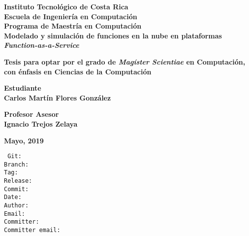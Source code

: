\documentclass[12pt, twoside]{report}
\begin{document}
\thispagestyle{plain}
\begin{titlepage}
	\begin{center}
        {\fontsize{24}{28}\selectfont \textbf{Instituto Tecnológico de Costa Rica}\\}
        \vspace{1cm}
        {\fontsize{20}{24}\selectfont \textbf{Escuela de Ingeniería en Computación}\\}
        {\fontsize{18}{22}\selectfont \textbf{Programa de Maestría en Computación}\\}
        \vspace{2cm}
        {\fontsize{20}{24}\selectfont \textbf{Modelado y simulación de funciones en la nube en plataformas \textit{Function-as-a-Service}}}    
    
    
        \vspace{2cm}
        {\fontsize{14}{17}\selectfont \textbf{Tesis para optar por el grado de \emph{Magíster Scientiae} en Computación, con énfasis en Ciencias de la Computación
}}
        
       \vspace{1.5cm}
       {\fontsize{14}{17}\selectfont \textbf{Estudiante\\ Carlos Martín Flores González}} 
       
       \vspace{1cm}
       {\fontsize{14}{17}\selectfont \textbf{Profesor Asesor\\ Ignacio Trejos Zelaya}}
       
       \vspace{1.5cm}
       {\fontsize{14}{17}\selectfont \textbf{Mayo, 2019}}                       
        
    \end{center}
\end{titlepage}

{} 
\renewcommand*\contentsname{Índice}

\renewcommand{\listtablename}{Lista de Tablas}


\newpage
{\footnotesize
\noindent
\texttt{
Git: \gitReferences \\
Branch: \gitBranch \\
Tag: \gitVtag \\
Release: \gitReln{} \\
Commit: \gitAbbrevHash \\
Date: \gitAuthorIsoDate \\
Author: \gitAuthorName\\
Email: \gitAuthorEmail\\
Committer: \gitCommitterName\\
Committer email: \gitCommitterEmail
}}
\newpage




\end{document}

